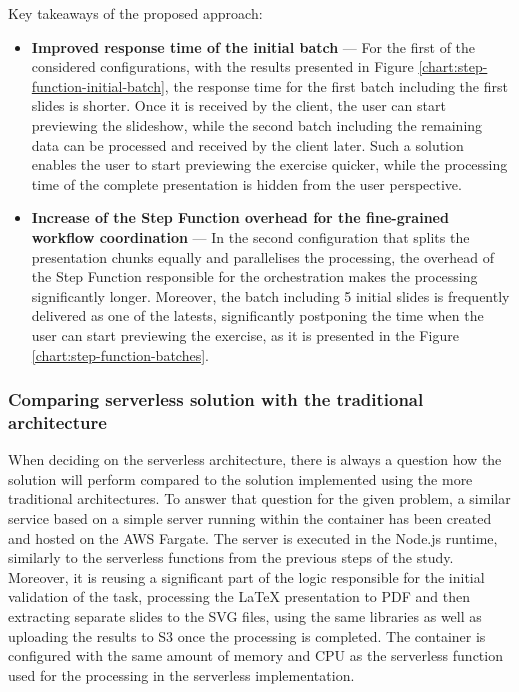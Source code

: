 Key takeaways of the proposed approach:

\begin{itemize}
   \item \textbf{Improved response time of the initial batch} --- For the first of the considered configurations, with the results presented in Figure \ref{chart:step-function-initial-batch}, the response time for the first batch including the first slides is shorter.
   Once it is received by the client, the user can start previewing the slideshow, while the second batch including the remaining data can be processed and received by the client later.
   Such a solution enables the user to start previewing the exercise quicker, while the processing time of the complete presentation is hidden from the user perspective.
   \item \textbf{Increase of the Step Function overhead for the fine-grained workflow coordination} --- In the second configuration that splits the presentation chunks equally and parallelises the processing, the overhead of the Step Function responsible for the orchestration makes the processing significantly longer.
   Moreover, the batch including 5 initial slides is frequently delivered as one of the latests, significantly postponing the time when the user can start previewing the exercise, as it is presented in the Figure \ref{chart:step-function-batches}.
\end{itemize}

\subsubsection{Comparing serverless solution with the traditional architecture}

When deciding on the serverless architecture, there is always a question how the solution will perform compared to the solution implemented using the more traditional architectures.
To answer that question for the given problem, a similar service based on a simple server running within the container has been created and hosted on the AWS Fargate. 
The server is executed in the Node.js runtime, similarly to the serverless functions from the previous steps of the study.
Moreover, it is reusing a significant part of the logic responsible for the initial validation of the task, processing the LaTeX presentation to PDF and then extracting separate slides to the SVG files, using the same libraries as well as uploading the results to S3 once the processing is completed.
The container is configured with the same amount of memory and CPU as the serverless function used for the processing in the serverless implementation.

